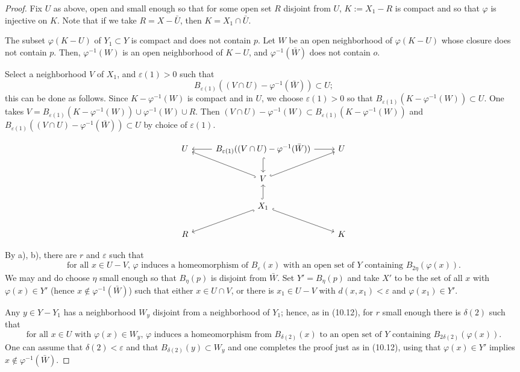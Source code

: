 \documentclass[12pt,a4paper]{article}
\theoremstyle{plain}
\theoremstyle{definition}
\theoremstyle{remark}
\begin{document}
\begin{proof}
Fix $U$ as above, open and small enough so that for some open set $R$ disjoint from $U$, $K := X_1 - R$ is compact and so that $\varphi$ is injective on $K$. Note that if we take $R = X - \bar{U}$, then $K = X_1 \cap \bar{U}$.

The subset $\varphi(K - U)$ of $Y_1 \subset Y$ is compact and does not contain $p$. Let $W$ be an open neighborhood of $\varphi(K - U)$ whose closure does not contain $p$. Then, $\varphi^{-1}(W)$ is an open neighborhood of $K - U$, and $\varphi^{-1}(\bar{W})$ does not contain $o$.

Select a neighborhood $V$ of $X_1$, and $\varepsilon(1) > 0$ such that
\[
B_{\varepsilon(1)}((V \cap U) - \varphi^{-1}(\bar{W})) \subset U;
\]
this can be done as follows. Since $K - \varphi^{-1}(W)$ is compact and in $U$, we choose $\varepsilon(1) > 0$ so that $B_{\varepsilon(1)}(K - \varphi^{-1}(W)) \subset U$. One takes $V = B_{\varepsilon(1)}(K - \varphi^{-1}(W)) \cup \varphi^{-1}(W) \cup R$. Then $(V \cap U) - \varphi^{-1}(W) \subset B_{\varepsilon(1)}(K - \varphi^{-1}(W))$ and $B_{\varepsilon(1)}((V \cap U) - \varphi^{-1}(\bar{W})) \subset U$ by choice of $\varepsilon(1)$.

\[
\begin{tikzcd}
U & \arrow[l] B_{\varepsilon(1)}((V \cap U) - \varphi^{-1}(\bar{W})) \arrow[r] \arrow[d, hook] & U \\
& V \arrow[ul, hook] \arrow[ur, hook] & \\
& X_1 \arrow[u, hook] \arrow[dl, hook] \arrow[dr, hook] & \\
R & & K
\end{tikzcd}
\]

By a), b), there are $r$ and $\varepsilon$ such that
\begin{equation*}
\tag{*} \text{for all } x \in U - V, \, \varphi \text{ induces a homeomorphism of } B_\varepsilon(x) \text{ with an open set of } Y \text{ containing } B_{2\eta}(\varphi(x)).\end{equation*}
We may and do choose $\eta$ small enough so that $B_\eta(p)$ is disjoint from $\bar{W}$. Set $Y' = B_\eta(p)$ and take $X'$ to be the set of all $x$ with $\varphi(x) \in Y'$ (hence $x \notin \varphi^{-1}(\bar{W})$) such that either $x \in U \cap V$, or there is $x_1 \in U - V$ with $d(x, x_1) < \varepsilon$ and $\varphi(x_1) \in Y'$.

Any $y \in Y - Y_1$ has a neighborhood $W_y$ disjoint from a neighborhood of $Y_1$; hence, as in (10.12), for $r$ small enough there is $\delta(2)$ such that
\begin{equation*}
\tag{**} \text{for all } x \in U \text{ with } \varphi(x) \in W_y, \, \varphi \text{ induces a homeomorphism from } B_{\delta(2)}(x) \text{ to an open set of } Y \text{ containing } B_{2\delta(2)}(\varphi(x)).\end{equation*}
One can assume that $\delta(2) < \varepsilon$ and that $B_{\delta(2)}(y) \subset W_y$ and one completes the proof just as in (10.12), using that $\varphi(x) \in Y'$ implies $x \notin \varphi^{-1}(\bar{W})$.
\end{proof}
\end{document}
